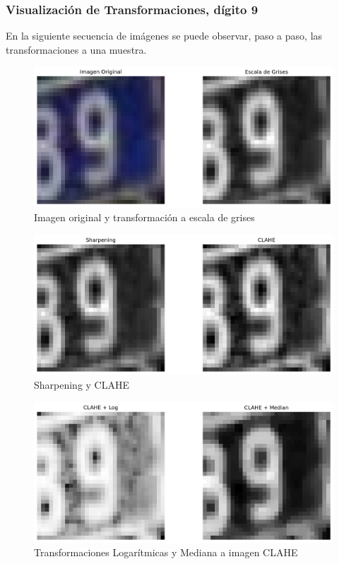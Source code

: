 \documentclass[journal]{IEEEtran}
\begin{document}
\subsubsection{Visualización de Transformaciones, dígito 9}
En la siguiente secuencia de imágenes se puede observar, paso a paso, las transformaciones a una muestra.

\begin{figure}[H]
        \centering
        \includegraphics[width=\linewidth]{figures/row_1_images.png}
        \caption{Imagen original y transformación a escala de grises}
        \label{fig:row_1}
\end{figure}

\begin{figure}[H]
        \centering
        \includegraphics[width=\linewidth]{figures/row_2_images.png}
        \caption{Sharpening y CLAHE}
        \label{fig:row_2}
\end{figure}

\begin{figure}[H]
        \centering
        \includegraphics[width=\linewidth]{figures/row_3_images.png}
        \caption{Transformaciones Logarítmicas y Mediana a imagen CLAHE}
        \label{fig:row_3}
\end{figure}
\end{document}
